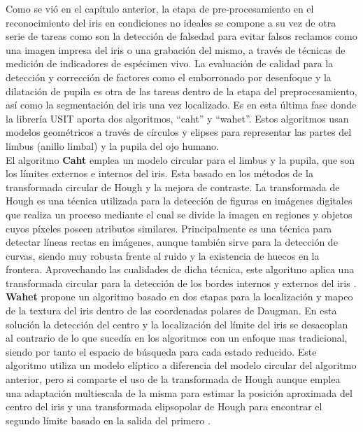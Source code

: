 Como se vió en el capítulo anterior, la etapa de pre-procesamiento en el reconocimiento del iris en condiciones no ideales se compone a su vez de otra serie de tareas como son la detección de falsedad para evitar falsos reclamos como una imagen impresa del iris o una grabación del mismo, a través de técnicas de medición de indicadores de espécimen vivo. La evaluación de calidad para la detección y corrección de factores como el emborronado por desenfoque y la dilatación de pupila es otra de las tareas dentro de la etapa del preprocesamiento, así como la segmentación del iris una vez localizado. Es en esta última fase donde la librería USIT aporta dos algoritmos, “caht” y “wahet”. Estos algoritmos usan modelos geométricos a través de círculos y elipses para representar las partes del limbus (anillo limbal) y la pupila del ojo humano. \\

El algoritmo \textbf{Caht} emplea un modelo circular para el limbus y la pupila, que son los límites externos e internos del iris. Esta basado en los métodos de la transformada circular de Hough y la mejora de contraste. La transformada de Hough es una técnica utilizada para la detección de figuras en imágenes digitales que realiza un proceso mediante el cual se divide la imagen en regiones y objetos cuyos píxeles poseen atributos similares. Principalmente es una técnica para detectar líneas rectas en imágenes, aunque también sirve para la detección de curvas, siendo muy robusta frente al ruido y la existencia de huecos en la frontera.  Aprovechando las cualidades de dicha técnica, este algoritmo aplica una transformada circular para la detección de los bordes internos y externos del iris \cite{Reference18}. \\

\textbf{Wahet}  propone un algoritmo basado en dos etapas para la localización y mapeo de la textura del iris dentro de las coordenadas polares de Daugman. En esta solución la detección del centro y la localización del límite del iris se desacoplan al contrario de lo que sucedía en los algoritmos con un enfoque mas tradicional, siendo por tanto el espacio de búsqueda para cada estado reducido. Este algoritmo utiliza un modelo elíptico a diferencia del modelo circular del algoritmo anterior, pero si comparte el uso de la transformada de Hough aunque emplea una adaptación multiescala de la misma para estimar la posición aproximada del centro del iris y una transformada elipsopolar de Hough para encontrar el segundo límite basado en la salida del primero \cite{Reference18}. \\

